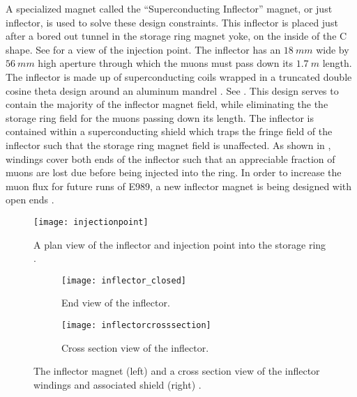 A specialized magnet called the ``Superconducting Inflector'' magnet, or just inflector, is used to solve these design constraints. This inflector is placed just after a bored out tunnel in the storage ring magnet yoke, on the inside of the C shape. See  for a view of the injection point. The inflector has an $\SI{18}{mm}$ wide by $\SI{56}{mm}$ high aperture through which the muons must pass down its $\SI{1.7}{m}$ length. The inflector is made up of superconducting coils wrapped in a truncated double cosine theta design around an aluminum mandrel \cite{inflector}. See . This design serves to contain the majority of the inflector magnet field, while eliminating the the storage ring field for the muons passing down its length. The inflector is contained within a superconducting shield which traps the fringe field of the inflector such that the storage ring magnet field is unaffected. As shown in , windings cover both ends of the inflector such that an appreciable fraction of muons are lost due before being injected into the ring. In order to increase the muon flux for future runs of E989, a new inflector magnet is being designed with open ends \cite{TDR}.


\begin{figure}
    \centering
    \texttt{[image: injectionpoint]}
    \caption[Muon injection point through inflector]{A plan view of the inflector and injection point into the storage ring \cite{inflector}.}   
    \label{fig:injectionpoint}
\end{figure}

\begin{figure}
\centering
    \begin{subfigure}[t]{0.45\textwidth}
        \centering
        \texttt{[image: inflector\_closed]}
        \caption{End view of the inflector.}
    \end{subfigure}%
    \hspace{1cm}
    \begin{subfigure}[t]{0.45\textwidth}
        \centering
        \texttt{[image: inflectorcrosssection]}
        \caption{Cross section view of the inflector.}
    \end{subfigure}
\caption[Superconducting inflector magnet]{The inflector magnet (left) and a cross section view of the inflector windings and associated shield (right) \cite{inflector}.}
\label{fig:inflector}
\end{figure}




